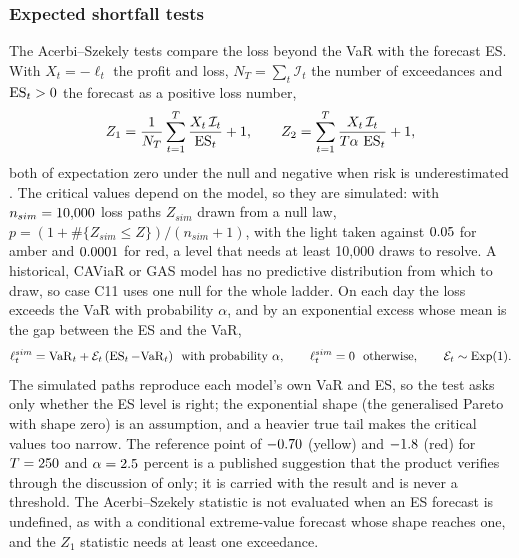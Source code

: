 \subsubsection{Expected shortfall tests}
The Acerbi--Szekely tests compare the loss beyond the VaR with the forecast ES. With $X_t=-\ell_t$ the profit and loss, $N_T=\sum_t\mathcal I_t$ the number of exceedances and
$\operatorname{ES}_t>0$ the forecast as a positive loss number,
\begin{equation}
Z_1=\frac1{N_T}\sum_{t=1}^{T}\frac{X_t\,\mathcal I_t}{\operatorname{ES}_t}+1,\qquad
Z_2=\sum_{t=1}^{T}\frac{X_t\,\mathcal I_t}{T\alpha\,\operatorname{ES}_t}+1,
\label{eq:mk-az}
\end{equation}
both of expectation zero under the null and negative when risk is underestimated \citep{market:acerbiszekely2014}. The critical values depend on the
model, so they are simulated: with $n_{sim}=10{,}000{}$ loss paths $Z_{sim}$ drawn from a null law, $p=(1+\#\{Z_{sim}\le Z\})/(n_{sim}+1)$, with the light taken against
$0.05{}$ for amber and $0.0001{}$ for red, a level that needs at least 10,000 draws to resolve. A historical, CAViaR or GAS model has no predictive
distribution from which to draw, so case C11 uses one null for the whole ladder. On each day the loss exceeds the VaR with probability $\alpha$,
and by an exponential excess whose mean is the gap between the ES and the VaR,
\begin{equation}
\ell^{sim}_t=\mathrm{VaR}_t+\mathcal E_t\,(\operatorname{ES}_t-\mathrm{VaR}_t)\ \text{ with probability }\alpha,\qquad\ell^{sim}_t=0\ \text{ otherwise},\qquad\mathcal E_t\sim\mathrm{Exp}(1).
\label{eq:mk-null}
\end{equation}
The simulated paths reproduce each model's own VaR and ES, so the test asks only whether the ES level is right; the exponential shape (the generalised Pareto with shape
zero) is an assumption, and a heavier true tail makes the critical values too narrow. The reference point of $-0.70{}$ (yellow) and $-1.8{}$ (red)
for $T=250{}$ and $\alpha=2.5{}$ percent is a published suggestion that the product verifies through the discussion of \citet{market:moldenhauerpitera2017}
only; it is carried with the result and is never a threshold. The Acerbi--Szekely statistic is not evaluated when an ES forecast is undefined, as with
a conditional extreme-value forecast whose shape reaches one, and the $Z_1$ statistic needs at least one exceedance.

